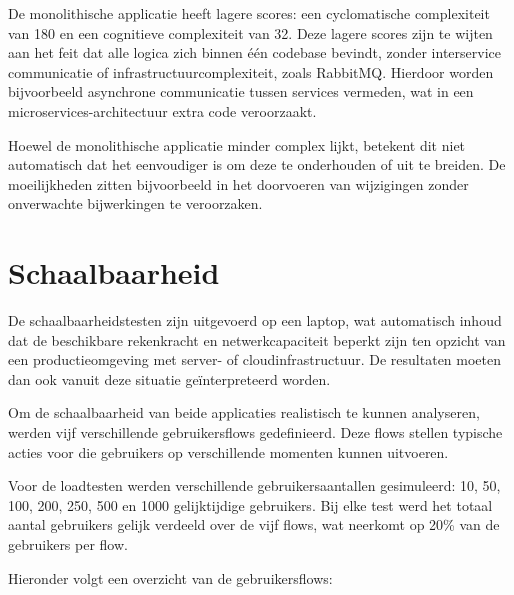 De monolithische applicatie heeft lagere scores: een cyclomatische complexiteit van 180 en een cognitieve complexiteit van 32. Deze lagere scores zijn te wijten aan het feit dat alle logica zich binnen één codebase bevindt, zonder interservice communicatie of infrastructuurcomplexiteit, zoals RabbitMQ. Hierdoor worden bijvoorbeeld asynchrone communicatie tussen services vermeden, wat in een microservices-architectuur extra code veroorzaakt.\newline

Hoewel de monolithische applicatie minder complex lijkt, betekent dit niet automatisch dat het eenvoudiger is om deze te onderhouden of uit te breiden. De moeilijkheden zitten bijvoorbeeld in het doorvoeren van wijzigingen zonder onverwachte bijwerkingen te veroorzaken.

\section{Schaalbaarheid}

De schaalbaarheidstesten zijn uitgevoerd op een laptop, wat automatisch inhoud dat de beschikbare rekenkracht en netwerkcapaciteit beperkt zijn ten opzicht van een productieomgeving met server- of cloudinfrastructuur. De resultaten moeten dan ook vanuit deze situatie geïnterpreteerd worden.\newline

Om de schaalbaarheid van beide applicaties realistisch te kunnen analyseren, werden vijf verschillende gebruikersflows gedefinieerd. Deze flows stellen typische acties voor die gebruikers op verschillende momenten kunnen uitvoeren.\newline

Voor de loadtesten werden verschillende gebruikersaantallen gesimuleerd: 10, 50, 100, 200, 250, 500 en 1000 gelijktijdige gebruikers. Bij elke test werd het totaal aantal gebruikers gelijk verdeeld over de vijf flows, wat neerkomt op 20\% van de gebruikers per flow.

Hieronder volgt een overzicht van de gebruikersflows:

